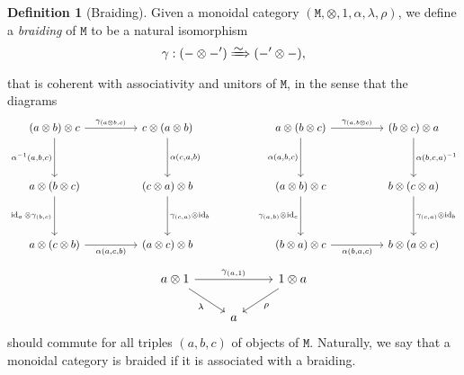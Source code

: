 \documentclass[11pt, reqno]{amsart}
\theoremstyle{definition}
\newtheorem{corollary}[theorem]{Corollary}
\newtheorem{definition}[theorem]{Definition}
\newcommand{\iso}{\simeq}
\newcommand{\arrowiso}{\iso}
\newcommand{\isonat}{\xRightarrow{\raisebox{-.6ex}[0ex][0ex]{\(\arrowiso\)}}}
\newcommand{\cat}{\texttt}
\DeclareMathOperator{\Id}{id}     %
\begin{document}
\begin{definition}[Braiding]
\label{def:braiding}
Given a monoidal category \((\cat M, \otimes, 1, \alpha, \lambda, \rho)\), we
define a \emph{braiding} of \(\cat M\) to be a natural isomorphism
\[
\gamma: (- \otimes -') \isonat (-' \otimes -),
\]
that is coherent with associativity and unitors of \(\cat M\), in the sense that
the diagrams
\[
\begin{tikzcd}
(a \otimes b) \otimes c
\ar[rr, "\gamma_{(a \otimes b, c)}"]
\ar[dd, "{\alpha^{-1}(a, b, c)}"']
&&c \otimes (a \otimes b)
\ar[dd, "{\alpha(c, a, b)}"]
\\
&&
\\
a \otimes (b \otimes c)
\ar[dd, "\Id_a \otimes \gamma_{(b, c)}"']
&&(c \otimes a) \otimes b
\ar[dd, "\gamma_{(c, a)} \otimes \Id_b"]
\\
&&
\\
a \otimes (c \otimes b)
\ar[rr, "\alpha{(a, c, b)}"']
&&(a \otimes c) \otimes b
\end{tikzcd}
\qquad
\qquad
\begin{tikzcd}
a \otimes (b \otimes c)
\ar[rr, "\gamma_{(a, b \otimes c)}"]
\ar[dd, "{\alpha(a, b, c)}"']
&&(b \otimes c) \otimes a
\ar[dd, "{\alpha(b, c, a)^{-1}}"]
\\
&&
\\
(a \otimes b) \otimes c
\ar[dd, "\gamma_{(a, b)} \otimes \Id_c"']
&&b \otimes (c \otimes a)
\ar[dd, "\gamma_{(c, a)} \otimes \Id_b"]
\\
&&
\\
(b \otimes a) \otimes c
\ar[rr, "\alpha{(b, a, c)}"']
&&b \otimes (a \otimes c)
\end{tikzcd}
\]
\[
\begin{tikzcd}
a \otimes 1 \ar[rr, "\gamma_{(a, 1)}"]
\ar[rd, "\lambda"']
&&1 \otimes a \ar[ld, "\rho"]
\\
&a &
\end{tikzcd}
\]
should commute for all triples \((a, b, c)\) of objects of \(\cat
M\). Naturally, we say that a monoidal category is braided if it is associated
with a braiding.
\end{definition}


\end{document}
